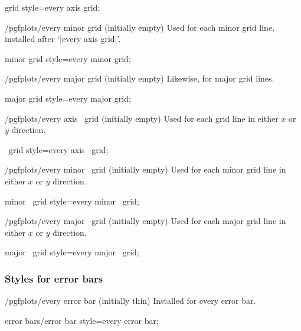 \pgfplotsshortstylekey grid style=every axis grid;

\begin{stylekey}{/pgfplots/every minor grid (initially empty)}
 Used for each minor grid line, installed after `|every axis grid|'.
\end{stylekey}

\pgfplotsshortstylekey minor grid style=every minor grid;

\begin{stylekey}{/pgfplots/every major grid (initially empty)}
 Likewise, for major grid lines.
\end{stylekey}

\pgfplotsshortstylekey major grid style=every major grid;

\begin{xystylekey}{/pgfplots/every axis \x\ grid (initially empty)}
	Used for each grid line in either $x$ or $y$ direction.
\end{xystylekey}

\pgfplotsshortxystylekey \x\ grid style=every axis \x\ grid;

\begin{xystylekey}{/pgfplots/every minor \x\ grid (initially empty)}
	Used for each minor grid line in either $x$ or $y$ direction.
\end{xystylekey}

\pgfplotsshortxystylekey minor \x\ grid style=every minor \x\ grid;

\begin{xystylekey}{/pgfplots/every major \x\ grid (initially empty)}
	Used for each major grid line in either $x$ or $y$ direction.
\end{xystylekey}

\pgfplotsshortxystylekey major \x\ grid style=every major \x\ grid;

\subsubsection*{Styles for error bars}

\begin{stylekey}{/pgfplots/every error bar (initially thin)}
 Installed for every error bar. 
\end{stylekey}

\pgfplotsshortstylekey error bars/error bar style=every error bar;


